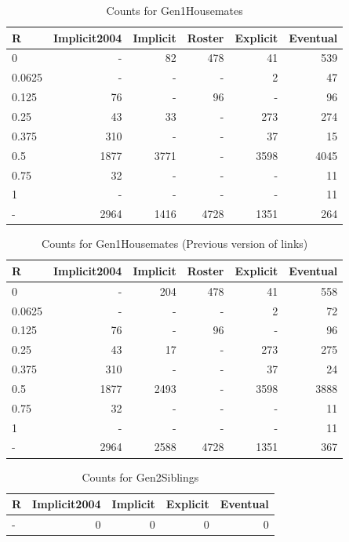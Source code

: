 \documentclass[a4paper]{article}\usepackage[]{graphicx}\usepackage[]{color}
\begin{document}
\begin{table}[ht]
\centering
{\large
\begin{tabular}{lrrrrr}
  \hline
R & Implicit2004 & Implicit & Roster & Explicit & Eventual \\ 
  \hline
0 & - &  82 & 478 &  41 & 539 \\ 
  0.0625 & - & - & - &   2 &  47 \\ 
  0.125 &  76 & - &  96 & - &  96 \\ 
  0.25 &  43 &  33 & - & 273 & 274 \\ 
  0.375 & 310 & - & - &  37 &  15 \\ 
  0.5 & 1877 & 3771 & - & 3598 & 4045 \\ 
  0.75 &  32 & - & - & - &  11 \\ 
  1 & - & - & - & - &  11 \\ 
  - & 2964 & 1416 & 4728 & 1351 & 264 \\ 
   \hline
\end{tabular}
}
\caption{Counts for Gen1Housemates} 
\end{table}
\begin{table}[ht]
\centering
{\large
\begin{tabular}{lrrrrr}
  \hline
R & Implicit2004 & Implicit & Roster & Explicit & Eventual \\ 
  \hline
0 & - & 204 & 478 &  41 & 558 \\ 
  0.0625 & - & - & - &   2 &  72 \\ 
  0.125 &  76 & - &  96 & - &  96 \\ 
  0.25 &  43 &  17 & - & 273 & 275 \\ 
  0.375 & 310 & - & - &  37 &  24 \\ 
  0.5 & 1877 & 2493 & - & 3598 & 3888 \\ 
  0.75 &  32 & - & - & - &  11 \\ 
  1 & - & - & - & - &  11 \\ 
  - & 2964 & 2588 & 4728 & 1351 & 367 \\ 
   \hline
\end{tabular}
}
\caption{Counts for Gen1Housemates (Previous version of links)} 
\end{table}
\begin{table}[ht]
\centering
{\large
\begin{tabular}{lrrrr}
  \hline
R & Implicit2004 & Implicit & Explicit & Eventual \\ 
  \hline
- &   0 &   0 &   0 &   0 \\ 
   \hline
\end{tabular}
}
\caption{Counts for Gen2Siblings} 
\end{table}
\end{document}
